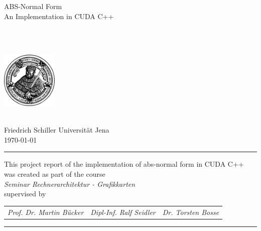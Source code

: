 \huge
ABS-Normal Form \\ An Implementation in CUDA C++ \\

\vspace{1cm}

\normalsize
\authorName \\
\email \\


\begin{center}
	\includegraphics[width=0.2\textwidth]{img/hanfried.png}
\end{center}
\hfill \\
Friedrich Schiller Universität Jena \\
\vspace{0.5cm}
\monthyeardate\today
\vspace{0.5cm}
\hrule
\vspace{0.5cm}
This project report of the implementation of abs-normal form in CUDA C++ \\ was created as part of the course\\[0.1cm]
\emph{Seminar Rechnerarchitektur - Grafikkarten}\\[0.1cm]
supervised by\\[0.1cm]

\begin{tabular}{r c l}
	\emph{Prof. Dr. Martin Bücker} & \emph{Dipl-Inf. Ralf Seidler} & \emph{Dr. Torsten Bosse}
\end{tabular}
\hfill

\vfill
\hrule
\vspace{0.5cm}
\begin{abstract}
	\itshape
	
\end{abstract}
\newpage